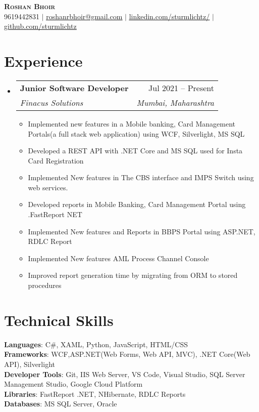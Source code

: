 \documentclass[letterpaper,11pt]{article}
\makeatletter
\newcommand{\resumeItem}[1]{
  \item\small{
    {#1 \vspace{-2pt}}
  }
}
\newcommand{\resumeSubheading}[4]{
  \vspace{-2pt}\item
    \begin{tabular*}{0.97\textwidth}[t]{l@{\extracolsep{\fill}}r}
      \textbf{#1} & #2 \\
      \textit{\small#3} & \textit{\small #4} \\
    \end{tabular*}\vspace{-7pt}
}
\newcommand{\resumeSubHeadingListStart}{\begin{itemize}[leftmargin=0.15in, label={}]}
\newcommand{\resumeSubHeadingListEnd}{\end{itemize}}
\newcommand{\resumeItemListStart}{\begin{itemize}}
\newcommand{\resumeItemListEnd}{\end{itemize}\vspace{-5pt}}
\makeatother
\begin{document}
\begin{center}
    \textbf{\Huge \scshape Roshan Bhoir} \\ \vspace{1pt}
    \small 9619442831 $|$ \href{mailto:x@x.com}{\underline{roshanrbhoir@gmail.com}} $|$ 
    \href{https://linkedin.com/in/sturmlichtz}{\underline{linkedin.com/sturmlichtz/}} $|$
    \href{https://github.com/sturmlichtz}{\underline{github.com/sturmlichtz}}
\end{center}

\section{Experience}
  \resumeSubHeadingListStart
    \resumeSubheading
      {Junior Software Developer}{Jul 2021 -- Present}
      {Finacus Solutions}{Mumbai, Maharashtra}
      \resumeItemListStart
        \resumeItem{Implemented new features in a Mobile banking, Card Management Portals(a full stack web application) using WCF, Silverlight, MS SQL }
        \resumeItem{Developed a REST API with .NET Core and MS SQL used for Insta Card Registration}
        \resumeItem{Implemented New features in The CBS interface and IMPS Switch using web services. }
        \resumeItem{Developed reports in Mobile Banking, Card Management Portal using .FastReport NET}
        \resumeItem{Implemented New features and Reports in BBPS Portal using ASP.NET, RDLC Report}
        \resumeItem{Implemented New features AML Process Channel Console }
        \resumeItem{Improved report generation time by migrating from ORM to stored procedures}
      \resumeItemListEnd
  \resumeSubHeadingListEnd

\section{Technical Skills}
 \begin{itemize}[leftmargin=0.15in, label={}]
    \small{\item{
     \textbf{Languages}{: C\#, XAML, Python, JavaScript, HTML/CSS} \\
     \textbf{Frameworks}{: WCF,ASP.NET(Web Forms, Web API, MVC), .NET Core(Web API), Silverlight} \\
     \textbf{Developer Tools}{: Git, IIS Web Server, VS Code, Visual Studio, SQL Server Management Studio, Google Cloud Platform} \\
     \textbf{Libraries}{: FastReport .NET, NHibernate, RDLC Reports}\\
     \textbf{Databases}{: MS SQL Server, Oracle} \\
    }}
 \end{itemize}
\end{document}

